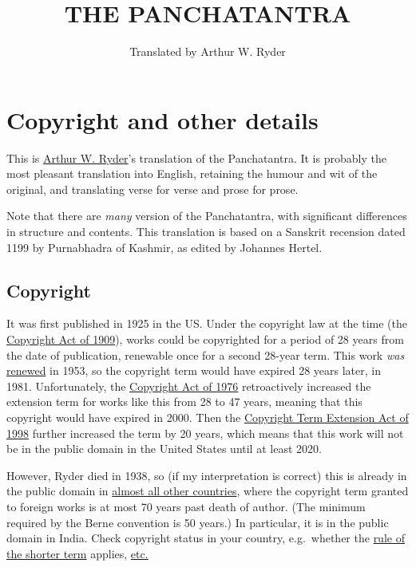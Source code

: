 \documentclass[article, twoside, 14pt]{memoir}
\title{THE PANCHATANTRA}
\author{Translated by Arthur W. Ryder}
\begin{document}
\maketitle

\tableofcontents

\chapter{Copyright and other details}

This is
\href{http://en.wikipedia.org/wiki/Arthur_W._Ryder}{Arthur W. Ryder}'s
translation of the Panchatantra. It is probably the most pleasant
translation into English, retaining the humour and wit of the
original, and translating verse for verse and prose for prose.

Note that there are \emph{many} version of the Panchatantra, with
significant differences in structure and contents. This translation
is based on a Sanskrit recension dated 1199 by Purnabhadra of
Kashmir, as edited by Johannes Hertel.

\section{Copyright}

It was first published in 1925 in the US. Under the copyright law
at the time (the
\href{http://en.wikipedia.org/wiki/Copyright_Act_of_1909}{Copyright Act of 1909}),
works could be copyrighted for a period of 28 years from the date
of publication, renewable once for a second 28-year term. This work
\emph{was}
\href{http://collections.stanford.edu/copyrightrenewals/bin/detail?fileID=697907992}{renewed}
in 1953, so the copyright term would have expired 28 years later,
in 1981. Unfortunately, the
\href{http://en.wikipedia.org/wiki/Copyright_Act_of_1976}{Copyright Act of 1976}
retroactively increased the extension term for works like this from
28 to 47 years, meaning that this copyright would have expired in
2000. Then the
\href{http://en.wikipedia.org/wiki/Copyright_Term_Extension_Act}{Copyright Term Extension Act of 1998}
further increased the term by 20 years, which means that this work
will not be in the public domain in the United States until at
least 2020.

However, Ryder died in 1938, so (if my interpretation is correct)
this is already in the public domain in
\href{http://en.wikipedia.org/wiki/List_of_countries%27_copyright_length}{almost all other countries},
where the copyright term granted to foreign works is at most 70
years past death of author. (The minimum required by the Berne
convention is 50 years.) In particular, it is in the public domain
in India. Check copyright status in your country, e.g.~whether the
\href{http://en.wikipedia.org/wiki/Rule_of_the_shorter_term}{rule of the shorter term}
applies, \href{http://www.copyright.gov/fls/fl100.html}{etc.}
\end{document}

